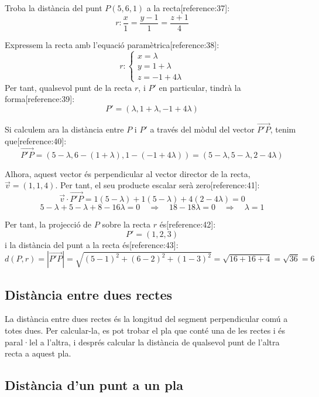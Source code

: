 \documentclass[12pt]{article}
\begin{document}
\begin{exemple}
Troba la distància del punt $P(5,6,1)$ a la recta[reference:37]:
\[
r: \frac{x}{1} = \frac{y-1}{1} = \frac{z+1}{4}
\]

Expressem la recta amb l'equació paramètrica[reference:38]:
\[
r:
\begin{cases}
x = \lambda \\
y = 1 + \lambda \\
z = -1 + 4\lambda
\end{cases}
\]
Per tant, qualsevol punt de la recta $r$, i $P'$ en particular, tindrà la forma[reference:39]:
\[
P' = (\lambda, 1+\lambda, -1+4\lambda)
\]

Si calculem ara la distància entre $P$ i $P'$ a través del mòdul del vector $\overrightarrow{P'P}$, tenim que[reference:40]:
\[
\overrightarrow{P'P} = (5-\lambda, 6-(1+\lambda), 1-(-1+4\lambda)) = (5-\lambda, 5-\lambda, 2-4\lambda)
\]

Alhora, aquest vector és perpendicular al vector director de la recta, $\vec{v}=(1,1,4)$. Per tant, el seu producte escalar serà zero[reference:41]:
\[
\vec{v} \cdot \overrightarrow{P'P} = 1(5-\lambda) + 1(5-\lambda) + 4(2-4\lambda) = 0
\]
\[
5-\lambda + 5-\lambda + 8 - 16\lambda = 0 \quad \Rightarrow \quad 18 - 18\lambda = 0 \quad \Rightarrow \quad \lambda = 1
\]

Per tant, la projecció de $P$ sobre la recta $r$ és[reference:42]:
\[
P' = (1, 2, 3)
\]
i la distància del punt a la recta és[reference:43]:
\[
d(P,r) = |\overrightarrow{P'P}| = \sqrt{(5-1)^2 + (6-2)^2 + (1-3)^2} = \sqrt{16 + 16 + 4} = \sqrt{36} = 6
\]
\end{exemple}

\subsection{Distància entre dues rectes}

\begin{concept}
La distància entre dues rectes és la longitud del segment perpendicular comú a totes dues. Per calcular-la, es pot trobar el pla que conté una de les rectes i és paral·lel a l'altra, i després calcular la distància de qualsevol punt de l'altra recta a aquest pla.
\end{concept}

\subsection{Distància d'un punt a un pla}
\end{document}
